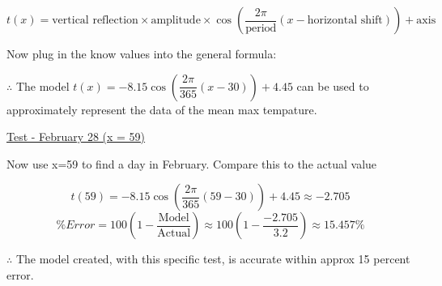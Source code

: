 \documentclass[12pt]{book}
\begin{document}
\begin{enumerate}
$$t(x) = \text{vertical reflection} \times \text{amplitude} \times \cos\left( \dfrac{2\pi}{\text{period}}  (x - \text{horizontal shift}) \right) + \text{axis}$$

\newpage

\begin{center}
    Now plug in the know values into the general formula:
\end{center}

$\therefore$ The model $\boxed{t(x) = -8.15\cos\left( \dfrac{2\pi}{365} (x - 30) \right) + 4.45}$ can be used to approximately represent the data of the mean max tempature.

\vspace{0.3cm}
\underline{Test - February 28 (x = 59)}

Now use x=59 to find a day in February. Compare this to the actual value

$$t(59) = -8.15\cos\left( \dfrac{2\pi}{365} (59 - 30) \right) + 4.45 \approx -2.705$$
\vspace{0.1cm}
$$\% Error = 100\left(1-\dfrac{\text{Model}}{\text{Actual}}\right) \approx 100\left(1-\dfrac{-2.705}{3.2}\right) \approx \boxed{15.457\%}$$

\begin{center}
    $\therefore$ The model created, with this specific test, is accurate within approx 15 percent error.
\end{center}

\newpage


\end{enumerate}
\end{document}

